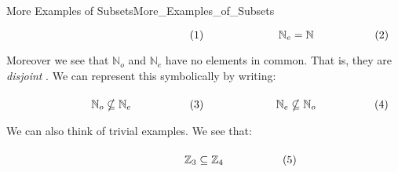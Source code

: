 \begin{lexample}{More Examples of Subsets}{More_Examples_of_Subsets}
\begin{subequations}
\begin{minipage}[b]{0.49\textwidth}
\begin{equation}
                    \end{equation}
                \end{minipage}
                \hfill
                \begin{minipage}[b]{0.49\textwidth}
                    \begin{equation}
                        \mathbb{N}_{e}=\mathbb{N}
                    \end{equation}
                \end{minipage}
            \end{subequations}
            \par\vspace{2.5ex}
            Moreover we see that $\mathbb{N}_{o}$ and $\mathbb{N}_{e}$ have no
            elements in common. That is, they are \textit{disjoint}%
            . We can represent this symbolically by
            writing:
            \par\hfill\par
            \begin{subequations}
                \begin{minipage}[b]{0.49\textwidth}
                    \begin{equation}
                        \mathbb{N}_{o}\nsubseteq\mathbb{N}_{e}
                    \end{equation}
                \end{minipage}
                \hfill
                \begin{minipage}[b]{0.49\textwidth}
                    \begin{equation}
                        \mathbb{N}_{e}\nsubseteq\mathbb{N}_{o}
                    \end{equation}
                \end{minipage}
            \end{subequations}
            \par\vspace{2.5ex}
            We can also think of trivial examples. We see that:
            \par\hfill\par
            \begin{subequations}
                \begin{minipage}[b]{0.49\textwidth}
                    \begin{equation}
                        \mathbb{Z}_{3}\subseteq\mathbb{Z}_{4}
                    \end{equation}

\end{minipage}
\end{subequations}
\end{lexample}
